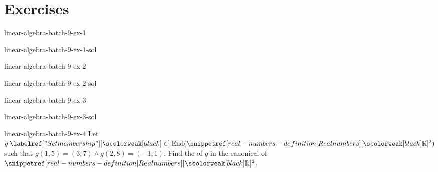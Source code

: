 \documentclass[preview]{standalone}
\begin{document}
\genpage

\section{Exercises}

\begin{snippetexercise}{linear-algebra-batch-9-ex-1}{}
    \todo
\end{snippetexercise}

\begin{snippetsolution}{linear-algebra-batch-9-ex-1-sol}{}
    \todo
\end{snippetsolution}

\begin{snippetexercise}{linear-algebra-batch-9-ex-2}{}
    \todo
\end{snippetexercise}

\begin{snippetsolution}{linear-algebra-batch-9-ex-2-sol}{}
    \todo
\end{snippetsolution}

\begin{snippetexercise}{linear-algebra-batch-9-ex-3}{}
    \todo
\end{snippetexercise}

\begin{snippetsolution}{linear-algebra-batch-9-ex-3-sol}{}
    \todo
\end{snippetsolution}

\begin{snippetexercise}{linear-algebra-batch-9-ex-4}{}
    Let \(g\in \text{End}(\realnumbers^2)\) such that
    \(g(1,5) = (3,7) \land g(2,8) = (-1,1)\). Find the \matrix of \(g\)
    in the canonical \basis of \(\realnumbers^2\).
\end{snippetexercise}
\end{document}

